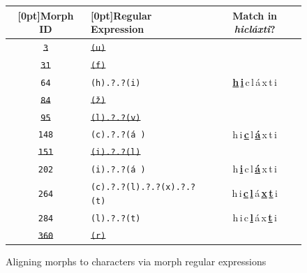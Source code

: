 \begin{figure}[t]
\centering
\setlength{\extrarowheight}{6pt}
 \begin{tabular}{clc}
\toprule
\raisebox{0pt}[0pt]{Morph ID} & \raisebox{0pt}[0pt]{Regular Expression} & Match in \textit{hicl\'{a}xti}? \\
 \midrule
                \sout{\texttt{3}} & \sout{\texttt{(u)}} & \\
                \sout{\texttt{31}} &  \sout{\texttt{(f)}} &  \\
                \texttt{64} &  \texttt{(h).?.?(i)} & \textbf{\underline{h}\,\underline{i}\,}c\,l\,\'{a}\,x\,t\,i  \\
               \sout{\texttt{84}} &  \sout{\texttt{(\v{z})}} &  \\
                \sout{\texttt{95}} &  \sout{\texttt{(l).?.?(v)}} & \\ %
                \texttt{148} &   \texttt{(c).?.?(\'{a}\,)} & h\,i\,\textbf{\underline{c}}\,l\,\textbf{\underline{\'{a}}}\,x\,t\,i \\
                \sout{\texttt{151}}  &  \sout{\texttt{(i).?.?(l)}} &  \\
                \texttt{202} &  \texttt{(i).?.?(\'{a}\,)} & h\,\textbf{\underline{i}}\,c\,l\,\textbf{\underline{\'{a}}}\,x\,t\,i \\
                \texttt{264} &  \texttt{(c).?.?(l).?.?(x).?.?(t)}  & h\,i\,\textbf{\underline{c}}\,\textbf{\underline{l}}\,\'{a}\,\textbf{\underline{x}}\,\textbf{\underline{t}}\,i \\
                \texttt{284} &  \texttt{(l).?.?(t)} & h\,i\,c\,\textbf{\underline{l}}\,\'{a}\,x\,\textbf{\underline{t}}\,i  \\
                \sout{\texttt{360}} &  \sout{\texttt{(r)}} & \\
       \bottomrule
 \end{tabular}
 \label{fig:morph-regex}
 \caption{Aligning morphs to characters via morph regular expressions}\label{fig:morph-regex}

\end{figure}
